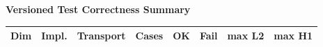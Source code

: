 \documentclass{article}
\begin{document}
\begin{center}
{\fontsize{8.0pt}{9.4pt}\selectfont
\textbf{Versioned Test Correctness Summary}

\vspace{0.6em}
\begin{tabular}{llllrrrr}
\hline
Dim & Impl. & Transport & Cases & OK & Fail & max L2 & max H1 \\
\hline
\hline
\end{tabular}
}
\end{center}
\end{document}
